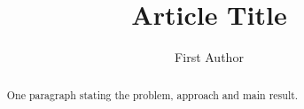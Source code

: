 \documentclass[acmsmall]{acmart}
\begin{document}
\title{Article Title}
\author{First Author}
\begin{abstract}
One paragraph stating the problem, approach and main result.
\end{abstract}
\maketitle




\end{document}
